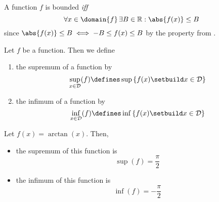 \begin{rem}\label{rem-bounded-function}
	A function $f$ is bounded \textit{iff}
	\begin{equation}
		\forall x\in\domain{f}\,\exists B\in\mathbb{R}:\abs{f(x)}\leq B
	\end{equation}
	since $\abs{f(x)}\leq B\iff -B\leq f(x) \leq B$ by the  property from
	.
\end{rem}

\begin{definition}\label{def-supremum-infimum-functions}
	Let $f$ be a function. Then we define
	\begin{enumerate}
		\item the supremum of a function by
		      \begin{equation}
			      \sup_{x\in\mathcal{D}}(f)\defines\sup\left\{f(x)\setbuild x\in\mathcal{D}\right\}
		      \end{equation}
		\item the infimum of a function by
		      \begin{equation}
			      \inf_{x\in\mathcal{D}}(f)\defines\inf\left\{f(x)\setbuild x\in\mathcal{D}\right\}
		      \end{equation}
	\end{enumerate}
\end{definition}

\begin{exm}
	Let $f(x)=\arctan(x)$. Then,
	\begin{itemize}
		\item the supremum of this function is
		      \begin{equation}
			      \sup(f)=\frac{\pi}{2}
		      \end{equation}
		\item the infimum of this function is
		      \begin{equation}
			      \inf(f)=-\frac{\pi}{2}
		      \end{equation}
	\end{itemize}
\end{exm}

